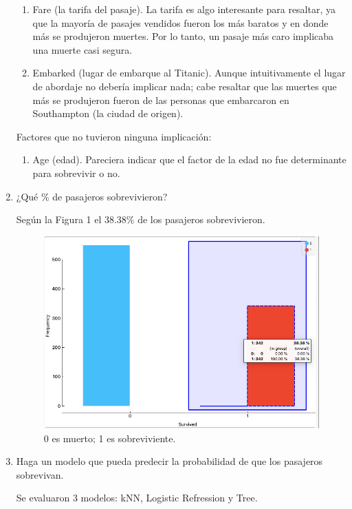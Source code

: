 \begin{enumerate}
\begin{sol}
\begin{enumerate}
			\item Fare (la tarifa del pasaje). La tarifa es algo interesante para resaltar, ya que la mayoría de pasajes vendidos fueron los más baratos y 
			en donde más se produjeron muertes. Por lo tanto, un pasaje más caro implicaba una muerte casi segura. 
			\item Embarked (lugar de embarque al Titanic). Aunque intuitivamente el lugar de abordaje no debería implicar nada; cabe resaltar que las muertes que más se produjeron fueron de las personas que embarcaron en Southampton (la ciudad de origen). 
		\end{enumerate}
	Factores que no tuvieron ninguna implicación: 
	\begin{enumerate}
		\item  Age (edad). Pareciera indicar que el factor de la edad no fue determinante para sobrevivir o no.  
	\end{enumerate}
	\end{sol}
	\item ¿Qué \% de pasajeros sobrevivieron?
	\begin{sol}
		Según la Figura 1 el 38.38\% de los pasajeros sobrevivieron. 
\begin{figure}[ht]
	\includegraphics[scale=0.4]{images/1}
	\centering 
	\caption{0 es muerto; 1 es sobreviviente.}
\end{figure}
	\end{sol}
	\item Haga un modelo que pueda predecir la probabilidad de que los pasajeros sobrevivan.
	\begin{sol} 
		Se evaluaron 3 modelos: kNN, Logistic Refression y Tree.
		\begin{figure}[ht]

\end{figure}
\end{sol}
\end{enumerate}
